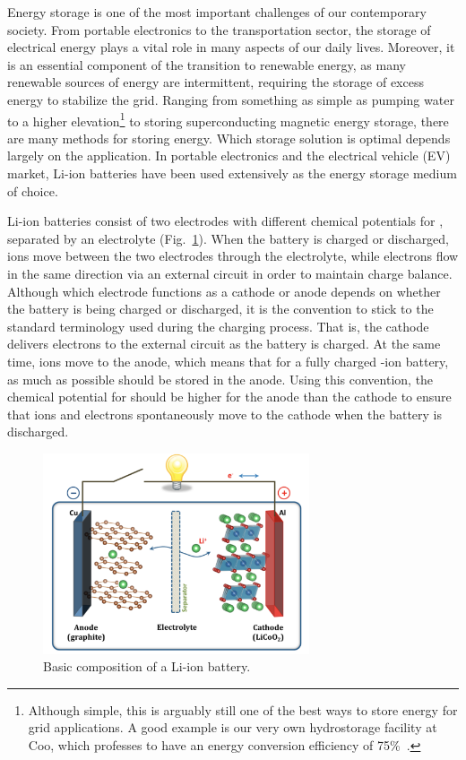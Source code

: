 \begin{refsection}
Energy storage is one of the most important challenges of our contemporary 
society. From portable electronics to the transportation sector, the storage 
of electrical energy plays a vital role in many aspects of our daily lives. 
Moreover, it is an essential component of the transition to renewable energy, 
as many renewable sources of energy are intermittent, requiring the storage of 
excess energy to stabilize the grid. Ranging from something as simple as 
pumping water to a higher elevation\footnote{Although simple, this is arguably 
still one of the best ways to store energy for grid applications. A good 
example is our very own hydrostorage facility at Coo, which professes to have 
an energy conversion efficiency of 75\%~\cite{Engie-Electrabel2015}.} to 
storing superconducting magnetic energy storage, there are many methods for 
storing energy. Which storage solution is optimal depends largely on the 
application. In portable electronics and the electrical vehicle (EV) market, 
Li-ion batteries have been used extensively as the energy storage medium of 
choice. 
 
Li-ion batteries consist of two electrodes with different chemical potentials 
for , separated by an electrolyte (Fig.~\ref{batteries:fig-li_ion}). 
When the battery is charged or discharged,  ions move between the two 
electrodes through the electrolyte, while electrons flow in the same direction 
via an external circuit in order to maintain charge balance. Although which 
electrode functions as a cathode or anode depends on whether the battery is 
being charged or discharged, it is the convention to stick to the standard 
terminology used during the charging process. That is, the cathode delivers 
electrons to the external circuit as the battery is charged. At the same time, 
 ions move to the anode, which means that for a fully charged 
-ion battery, as much  as possible should be stored in the 
anode. Using this convention, the chemical potential for  should be 
higher for the anode than the cathode to ensure that  ions and 
electrons spontaneously move to the cathode when the battery is discharged. 
 
\begin{figure}[h] 
\centering 
\includegraphics[width=0.7\textwidth]{./figures/batteries/li-ion_battery.png} 
\caption{Basic composition of a Li-ion battery. \tocite} 
\label{batteries:fig-li_ion} 
\end{figure} 
 

\end{refsection}
